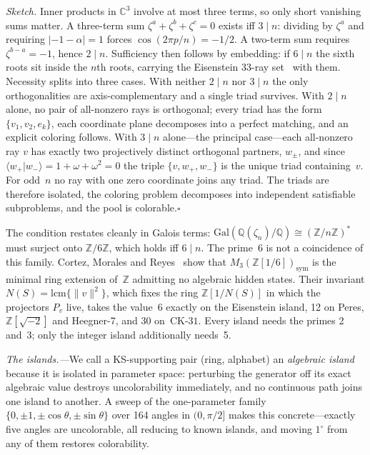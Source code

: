 \documentclass[twocolumn,prl,superscriptaddress,nofootinbib]{revtex4-2}
\newcommand{\C}{\mathbb{C}}
\newcommand{\Z}{\mathbb{Z}}
\newcommand{\Q}{\mathbb{Q}}
\newcommand{\CK}{\mathrm{CK}\text{-}31}
\newcommand{\braket}[2]{\langle#1|#2\rangle}
\begin{document}
\noindent\emph{Sketch.}  Inner products in $\C^3$ involve at most three terms, so
only short vanishing sums matter.  A three-term sum $\zeta^a+\zeta^b+\zeta^c=0$
exists iff $3 \mid n$: dividing by $\zeta^a$ and requiring $|{-}1-\alpha|=1$ forces
$\cos(2\pi p/n)=-1/2$.  A two-term sum requires $\zeta^{b-a}=-1$, hence $2\mid n$.
Sufficiency then follows by embedding: if $6\mid n$ the sixth roots sit inside the
$n$th roots, carrying the Eisenstein 33-ray set~\cite{Cabello2025simplest} with
them.  Necessity splits into three cases.  With neither $2\mid n$ nor $3\mid n$ the
only orthogonalities are axis-complementary and a single triad survives.  With
$2\mid n$ alone, no pair of all-nonzero rays is orthogonal; every triad has the
form $\{v_1,v_2,e_k\}$, each coordinate plane decomposes into a perfect matching,
and an explicit coloring follows.  With $3\mid n$ alone---the principal
case---each all-nonzero ray $v$ has exactly two projectively distinct orthogonal
partners, $w_\pm$, and since $\braket{w_+}{w_-}=1+\omega+\omega^2=0$ the triple
$\{v,w_+,w_-\}$ is the unique triad containing~$v$.  For odd~$n$ no ray with one
zero coordinate joins any triad.  The triads are therefore isolated, the coloring
problem decomposes into independent satisfiable subproblems, and the pool is
colorable.\hfill$\square$

The condition restates cleanly in Galois terms: $\mathrm{Gal}(\Q(\zeta_n)/\Q)
\cong (\Z/n\Z)^*$ must surject onto $\Z/6\Z$, which holds iff $6\mid n$.  The
prime~6 is not a coincidence of this family.  Cortez, Morales and
Reyes~\cite{CortezMoralesReyes2022} show that $M_3(\Z[1/6])_\mathrm{sym}$ is the
minimal ring extension of~$\Z$ admitting no algebraic hidden states.  Their
invariant $N(S)=\mathrm{lcm}\{\|v\|^2\}$, which fixes the ring $\Z[1/N(S)]$ in
which the projectors $P_v$ live, takes the value~6 exactly on the Eisenstein
island, 12 on Peres, $\Z[\sqrt{-2}]$ and Heegner-7, and 30 on~$\CK$.  Every
island needs the primes 2 and~3; only the integer island additionally needs~5.

\textit{The islands.---}We call a KS-supporting pair (ring, alphabet) an
\emph{algebraic island} because it is isolated in parameter space: perturbing the
generator off its exact algebraic value destroys uncolorability immediately, and
no continuous path joins one island to another.  A sweep of the one-parameter
family $\{0,\pm1,\pm\cos\theta,\pm\sin\theta\}$ over 164 angles in $(0,\pi/2]$
makes this concrete---exactly five angles are uncolorable, all reducing to known
islands, and moving $1^\circ$ from any of them restores colorability.
\end{document}
